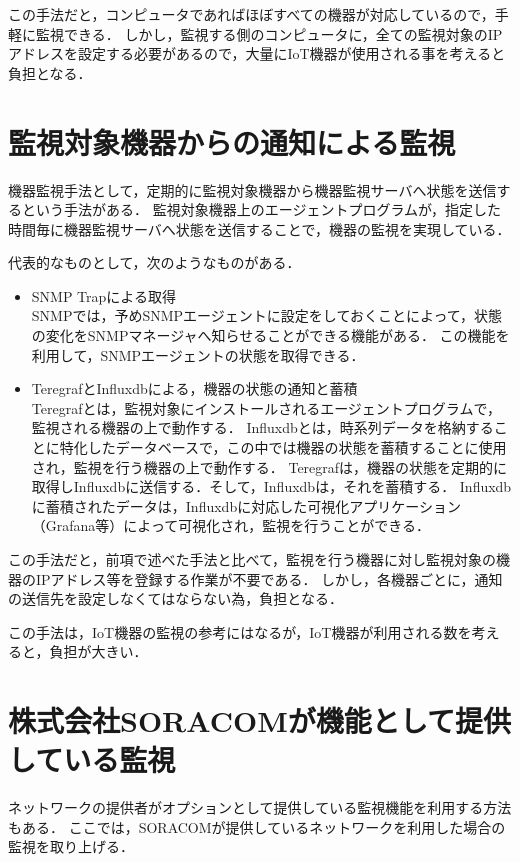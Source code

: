 	この手法だと，コンピュータであればほぼすべての機器が対応しているので，手軽に監視できる．
	しかし，監視する側のコンピュータに，全ての監視対象のIPアドレスを設定する必要があるので，大量にIoT機器が使用される事を考えると負担となる．

\section{監視対象機器からの通知による監視}
	機器監視手法として，定期的に監視対象機器から機器監視サーバへ状態を送信するという手法がある．
	監視対象機器上のエージェントプログラムが，指定した時間毎に機器監視サーバへ状態を送信することで，機器の監視を実現している．
	\medskip
	
	代表的なものとして，次のようなものがある．
	\begin{itemize}
		\item SNMP Trapによる取得\\
			SNMPでは，予めSNMPエージェントに設定をしておくことによって，状態の変化をSNMPマネージャへ知らせることができる機能がある．
			この機能を利用して，SNMPエージェントの状態を取得できる．
		\item TeregrafとInfluxdbによる，機器の状態の通知と蓄積\\
					Teregrafとは，監視対象にインストールされるエージェントプログラムで，監視される機器の上で動作する．
					Influxdbとは，時系列データを格納することに特化したデータベースで，この中では機器の状態を蓄積することに使用され，監視を行う機器の上で動作する．
					Teregrafは，機器の状態を定期的に取得しInfluxdbに送信する．そして，Influxdbは，それを蓄積する．
					Influxdbに蓄積されたデータは，Influxdbに対応した可視化アプリケーション（Grafana等）によって可視化され，監視を行うことができる．
	\end{itemize}
	
	この手法だと，前項で述べた手法と比べて，監視を行う機器に対し監視対象の機器のIPアドレス等を登録する作業が不要である．
	しかし，各機器ごとに，通知の送信先を設定しなくてはならない為，負担となる．

	この手法は，IoT機器の監視の参考にはなるが，IoT機器が利用される数を考えると，負担が大きい．

\section{株式会社SORACOMが機能として提供している監視} %
	ネットワークの提供者がオプションとして提供している監視機能を利用する方法もある．
	ここでは，SORACOMが提供しているネットワークを利用した場合の監視を取り上げる．
	
